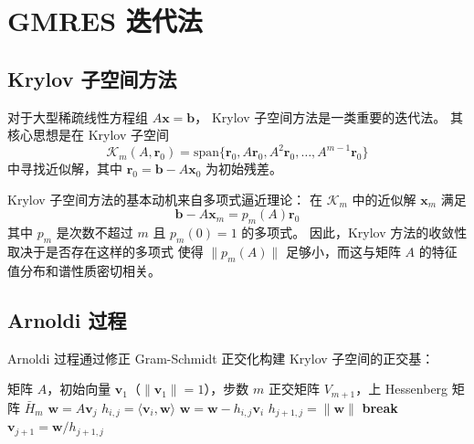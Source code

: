 \section{GMRES 迭代法}
\label{sec:gmres}

\subsection{Krylov 子空间方法}

对于大型稀疏线性方程组 $A\mathbf{x} = \mathbf{b}$，
Krylov 子空间方法是一类重要的迭代法。
其核心思想是在 Krylov 子空间
\begin{equation}
  \mathcal{K}_m(A, \mathbf{r}_0) = \mathrm{span}\{\mathbf{r}_0, A\mathbf{r}_0, A^2\mathbf{r}_0, \ldots, A^{m-1}\mathbf{r}_0\}
\end{equation}
中寻找近似解，其中 $\mathbf{r}_0 = \mathbf{b} - A\mathbf{x}_0$ 为初始残差。

Krylov 子空间方法的基本动机来自多项式逼近理论：
在 $\mathcal{K}_m$ 中的近似解 $\mathbf{x}_m$ 满足
\begin{equation}
  \mathbf{b} - A\mathbf{x}_m = p_m(A)\mathbf{r}_0
\end{equation}
其中 $p_m$ 是次数不超过 $m$ 且 $p_m(0) = 1$ 的多项式。
因此，Krylov 方法的收敛性取决于是否存在这样的多项式
使得 $\|p_m(A)\|$ 足够小，而这与矩阵 $A$ 的特征值分布和谱性质密切相关。

\subsection{Arnoldi 过程}

Arnoldi 过程通过修正 Gram-Schmidt 正交化构建 Krylov 子空间的正交基：
\begin{algorithm}
\caption{Arnoldi 过程}
\begin{algorithmic}[1]
\REQUIRE 矩阵 $A$，初始向量 $\mathbf{v}_1$（$\|\mathbf{v}_1\| = 1$），步数 $m$
\ENSURE 正交矩阵 $V_{m+1}$，上 Hessenberg 矩阵 $\bar{H}_m$
  \STATE $\mathbf{w} = A\mathbf{v}_j$
    \STATE $h_{i,j} = \langle \mathbf{v}_i, \mathbf{w} \rangle$
    \STATE $\mathbf{w} = \mathbf{w} - h_{i,j}\mathbf{v}_i$
  \ENDFOR
  \STATE $h_{j+1,j} = \|\mathbf{w}\|$
    \STATE \textbf{break} 
  \ENDIF
  \STATE $\mathbf{v}_{j+1} = \mathbf{w} / h_{j+1,j}$
\ENDFOR
\end{algorithmic}
\end{algorithm}

